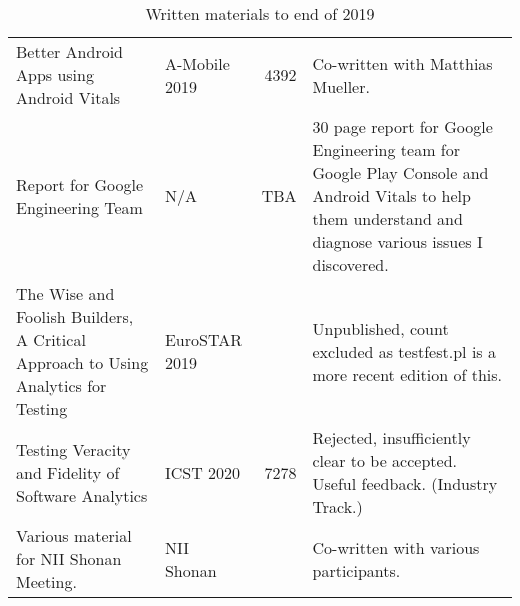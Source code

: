 \begin{table}[htpb]
\begin{tabular}{p{4.3cm}|p{1.9cm}|r|p{4.7cm}}
     Better Android Apps using Android Vitals &A-Mobile 2019 &4392 &Co-written with Matthias Mueller.\\
     
     Report for Google Engineering Team &N/A &TBA &30 page report for Google Engineering team for Google Play Console and Android Vitals to help them understand and diagnose various issues I discovered.\\
     
     The Wise and Foolish Builders, A Critical Approach to Using Analytics for Testing &EuroSTAR 2019 & &Unpublished, count excluded as testfest.pl is a more recent edition of this.\\
     
     Testing Veracity and Fidelity of Software Analytics &ICST 2020 &7278 &Rejected, insufficiently clear to be accepted. Useful feedback. (Industry Track.)\\
     
     Various material for NII Shonan Meeting. &NII Shonan & &Co-written with various participants.\\

    \end{tabular}
    \caption{Written materials to end of 2019}
    \label{tab:written_materials_to_end_2019}
\end{table}     
